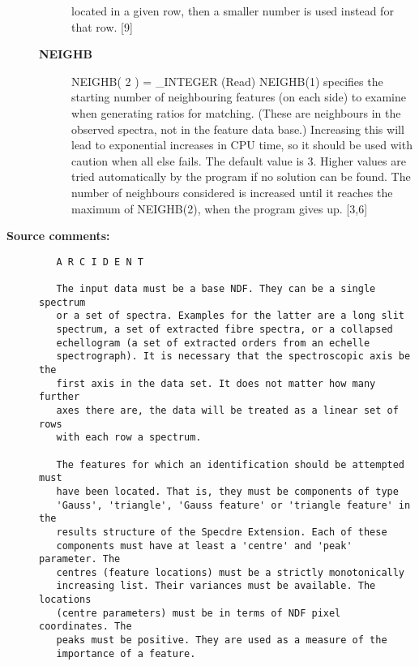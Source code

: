\begin{description}
\begin{description}
   located in a given row, then a smaller number is used instead
   for that row. [9]
\item [{\bf NEIGHB}]
NEIGHB( 2 ) = _INTEGER (Read)
   NEIGHB(1) specifies the starting number of neighbouring
   features (on each side) to examine when generating ratios for
   matching. (These are neighbours in the observed spectra, not in
   the feature data base.) Increasing this will lead to
   exponential increases in CPU time, so it should be used with
   caution when all else fails. The default value is 3. Higher
   values are tried automatically by the program if no solution
   can be found. The number of neighbours considered is increased
   until it reaches the maximum of NEIGHB(2), when the program
   gives up. [3,6]

\end{description}

\item [{\bf Source comments:}]
\begin{verbatim}
   A R C I D E N T

   The input data must be a base NDF. They can be a single spectrum
   or a set of spectra. Examples for the latter are a long slit
   spectrum, a set of extracted fibre spectra, or a collapsed
   echellogram (a set of extracted orders from an echelle
   spectrograph). It is necessary that the spectroscopic axis be the
   first axis in the data set. It does not matter how many further
   axes there are, the data will be treated as a linear set of rows
   with each row a spectrum.

   The features for which an identification should be attempted must
   have been located. That is, they must be components of type
   'Gauss', 'triangle', 'Gauss feature' or 'triangle feature' in the
   results structure of the Specdre Extension. Each of these
   components must have at least a 'centre' and 'peak' parameter. The
   centres (feature locations) must be a strictly monotonically
   increasing list. Their variances must be available. The locations
   (centre parameters) must be in terms of NDF pixel coordinates. The
   peaks must be positive. They are used as a measure of the
   importance of a feature.


\end{verbatim}
\end{description}
